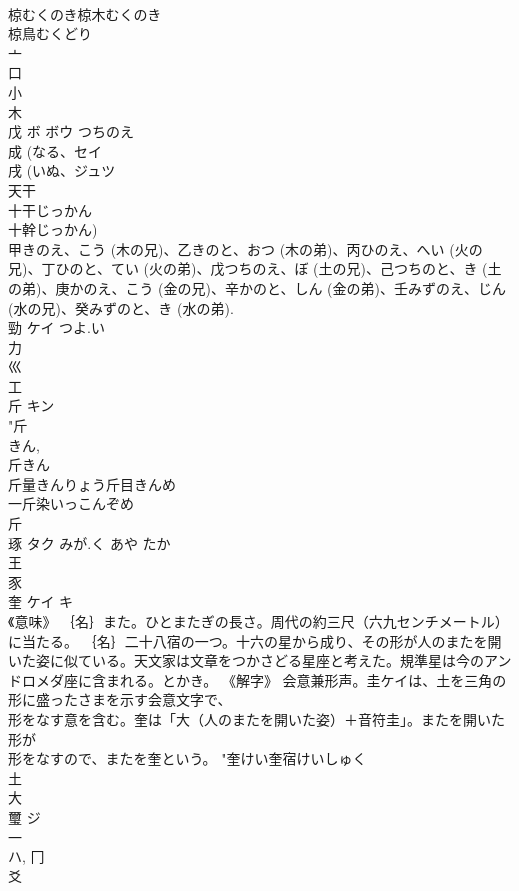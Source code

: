 \documentclass[8pt]{extreport}
\begin{document}
\begin{CJK}{UTF8}{min}
\\	椋むくのき椋木むくのき
\\	椋鳥むくどり
\\	亠 
\\	口 
\\	小 
\\	木 
\\	戊	ボ ボウ	つちのえ	
\\	成 (なる、セイ 
\\	戌 (いぬ、ジュツ 
\\	天干 
\\	十干じっかん 
\\	十幹じっかん) 
\\	甲きのえ、こう (木の兄)、乙きのと、おつ (木の弟)、丙ひのえ、へい (火の兄)、丁ひのと、てい (火の弟)、戊つちのえ、ぼ (土の兄)、己つちのと、き (土の弟)、庚かのえ、こう (金の兄)、辛かのと、しん (金の弟)、壬みずのえ、じん (水の兄)、癸みずのと、き (水の弟). 
\\	勁	ケイ	つよ.い	
\\	力 
\\	巛 
\\	工 
\\	斤	キン		
\\	"斤 
\\	きん, 
\\	斤きん
\\	斤量きんりょう斤目きんめ
\\	一斤染いっこんぞめ
\\	斤 
\\	琢	タク	みが.く あや たか	
\\	王 
\\	豕 
\\	奎	ケイ キ		
\\	《意味》 ｛名｝また。ひとまたぎの長さ。周代の約三尺（六九センチメートル）に当たる。 ｛名｝二十八宿の一つ。十六の星から成り、その形が人のまたを開いた姿に似ている。天文家は文章をつかさどる星座と考えた。規準星は今のアンドロメダ座に含まれる。とかき。 《解字》 会意兼形声。圭ケイは、土を三角の形に盛ったさまを示す会意文字で、
\\	形をなす意を含む。奎は「大（人のまたを開いた姿）＋音符圭」。またを開いた形が
\\	形をなすので、またを奎という。		"奎けい奎宿けいしゅく
\\	土 
\\	大 
\\	璽	ジ		
\\	一 
\\	ハ, 冂 
\\	爻 

\end{CJK}
\end{document}
